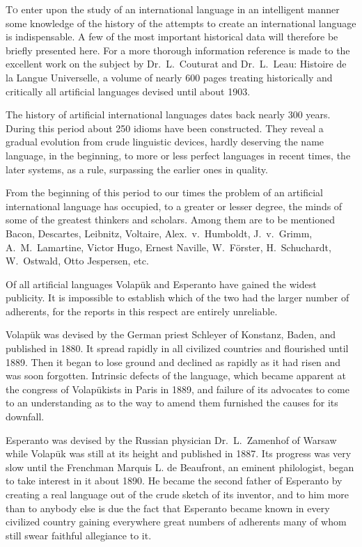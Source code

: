 \lettrine{T}{o} enter upon the study of an international language in an intelligent manner some knowledge of the history of the attempts to create an international language is indispensable. A few of the most important historical data will therefore be briefly presented here. For a more thorough information reference is made to the excellent work on the subject by Dr.~L.~Couturat and Dr.~L.~Leau: Histoire de la Langue Universelle, a volume of nearly 600 pages treating historically and critically all artificial languages devised until about 1903. 

The history of artificial international languages dates back nearly 300 years. During this period about 250 idioms have been constructed. They reveal a gradual evolution from crude linguistic devices, hardly deserving the name language, in the beginning, to more or less perfect languages in recent times, the later systems, as a rule, surpassing the earlier ones in quality. 

From the beginning of this period to our times the problem of an artificial international language has occupied, to a greater or lesser degree, the minds of some of the greatest thinkers and scholars. Among them are to be mentioned Bacon, Descartes, Leibnitz, Voltaire, Alex.~v.~Humboldt, J.~v.~Grimm, A.~M.~Lamartine, Victor Hugo, Ernest Naville, W.~Förster, H.~Schuchardt, W.~Ostwald, Otto Jespersen, etc. 

Of all artificial languages Volapük and Esperanto have gained the widest publicity. It is impossible to establish which of the two had the larger number of adherents, for the reports in this respect are entirely unreliable. 

Volapük was devised by the German priest Schleyer of Konstanz, Baden, and published in 1880. It spread rapidly in all civilized countries and flourished until 1889. Then it began to lose ground and declined as rapidly as it had risen and was soon forgotten. Intrinsic defects of the language, which became apparent at the congress of Volapükists in Paris in 1889, and failure of its advocates to come to an understanding as to the way to amend them furnished the causes for its downfall. 

Esperanto was devised by the Russian physician Dr.~L.~Zamenhof of Warsaw while Volapük was still at its height and published in 1887. Its progress was very slow until the Frenchman Marquis L. de Beaufront, an eminent philologist, began to take interest in it about 1890. He became the second father of Esperanto by creating a real language out of the crude sketch of its inventor, and to him more than to anybody else is due the fact that Esperanto became known in every civilized country gaining everywhere great numbers of adherents many of whom still swear faithful allegiance to it. 

